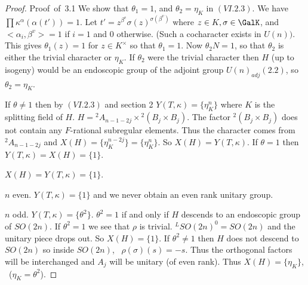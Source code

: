 \documentclass{memo-l}
\theoremstyle{definition}
\theoremstyle{remark}
\numberwithin{section}{chapter}
\numberwithin{equation}{chapter}
\begin{document}
\begin{proof} {Proof\ of\ 3.1}
   We show that ${\theta}_{1} = 1$, and ${\theta}_{2}  =  {\eta}_{K}$ in
$(VI.2.3)$.  We have $\prod{\kappa}^{{\alpha}}({\alpha}(t'))  =  1$.  Let $t'
 =  z^{{\beta}^{v}} {\sigma}(z)^{ {\sigma}({\beta}^{v})}$ where $z
 \in  K, {\sigma}  \in  \GalK$, and $<{\alpha}_{i},{\beta}^{v}>  =  1$ if
$i = 1$ and $0$ otherwise.  (Such a cocharacter exists in $U(n))$.  This
gives ${\theta}_{1}(z)  =  1$ for $z  \in  K^{\times}$ so that ${\theta}_{1}  =  1$.
Now ${\theta}_{2} N  =  1$, so that ${\theta}_{2}$ is either the trivial
character or ${\eta}_{K}$.  If ${\theta}_{2}$ were the trivial character
then $H$ (up to isogeny) would be an endoscopic group
of the adjoint group $U(n)_{adj} (2.2)$, so ${\theta}_{2}  =  {\eta}_{K}$.

 If ${\theta} \ne 1$ then by $(VI.2.3)$ and section 2 
$Y(T,{\kappa}) = \{{\eta}_{K}^{n}\}$ where $K$ is the splitting field of $H$.
$H  =  {}^{2}A_{n-1-2j} \times {}^{2}(B_{j} \times B_{j})$.  The factor
${}^{2}(B_{j} \times B_{j})$ does not contain any $F$-rational subregular
elements.  Thus the character comes from ${}^{2}A_{n-1-2j}$ and $X(H)  = 
\{{\eta}_{K}^{n-2j}\}  =  \{{\eta}_{K}^{n}\}$.  So $X(H)  =  Y(T,{\kappa})$.
If ${\theta} = 1$ then $Y(T,{\kappa}) = X(H) = \{1\}$.
\enddefinition
 
 $X(H)  =  Y(T,{\kappa})  =  \{1\}$.\enddefinition

  $n$ even.  $Y(T,{\kappa})  =  \{1\}$ and we never
obtain an even rank unitary group.  
\enddefinition

 $n$ odd.  $Y(T,{\kappa})  =  \{{\theta}^{2}\}$.
${\theta}^{2} = 1$ if and only if $H$ descends to an endoscopic group of
$SO(2n)$.  If ${\theta}^{2} = 1$ we see that ${\rho }$ is trivial.
${}^{L}SO(2n)^{0}  =  SO(2n)$ and the unitary piece drops out.  So $X(H)  = 
\{1\}$.  If ${\theta}^{2} \ne 1$ then $H$ does not descend to $SO(2n)$ so
inside $SO(2n)$, \  ${\rho }({\sigma})(s)  =  -s$.  Thus the orthogonal factors
will be interchanged and $A_{j}$ will be unitary (of even rank).  Thus
$X(H)  =  \{{\eta}_{K}\}$, \  (${\eta}_{K}  =  {\theta}^{2}$).
\enddefinition

\enddefinition


\end{proof}
\end{document}
